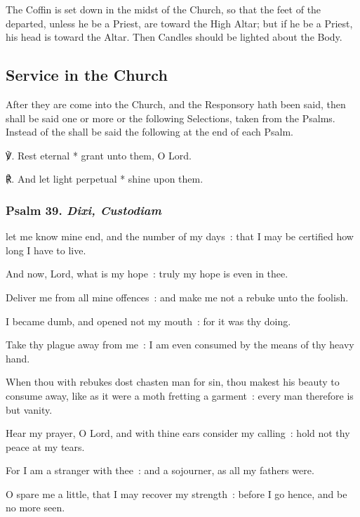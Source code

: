 \begin{rubric}
	The Coffin is set down in the midst of the Church, so that the feet of the departed, unless he be a Priest, are toward the High Altar; but if he be a Priest, his head is toward the Altar. Then Candles should be lighted about the Body.
\end{rubric}

\subsection{Service in the Church}
\begin{rubric}
    After they are come into the Church, and the Responsory hath been said, then shall be said one or more or the following Selections, taken from the Psalms. Instead of the  shall be said the following at the end of each Psalm.
\end{rubric}
℣. Rest eternal * grant unto them, O Lord.\par
℟. And let light perpetual * shine upon them.\par\noindent

\subsubsection{Psalm 39. \textit{Dixi, Custodiam}}
 let me know mine end, and the number of my days~: that I may be certified how long I have to live.\par
{}
And now, Lord, what is my hope~: truly my hope is even in thee.\par
{}Deliver me from all mine offences~: and make me not a rebuke unto the foolish.\par
{}I became dumb, and opened not my mouth~: for it was thy doing.\par
{}Take thy plague away from me~: I am even consumed by the means of thy heavy hand.\par
{}When thou with rebukes dost chasten man for sin, thou makest his beauty to consume away, like as it were a moth fretting a garment~: every man therefore is but vanity.\par
{}Hear my prayer, O Lord, and with thine ears consider my calling~: hold not thy peace at my tears.\par
{}For I am a stranger with thee~: and a sojourner, as all my fathers were.\par
{}O spare me a little, that I may recover my strength~: before I go hence, and be no more seen.\par


